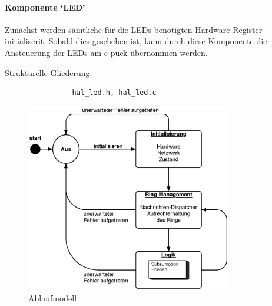 \documentclass[10pt,a4paper]{article}
\begin{document}
			\paragraph*{Komponente `LED'}
			Zunächst werden sämtliche für die LEDs benötigten Hardware-Register initialiserit. Sobald dies geschehen ist, kann durch diese Komponente 
			die Ansteuerung der LEDs am e-puck übernommen werden.
			
			Strukturelle Gliederung:
				\begin{verbatim}  
				hal_led.h, hal_led.c
				\end{verbatim}
				
				
		\begin{figure}[h]
			\centering
			\includegraphics[width=9cm]{images/e-puck.eps}
  			\caption{Ablaufmodell}
  		\end{figure}
  		
\end{document}
